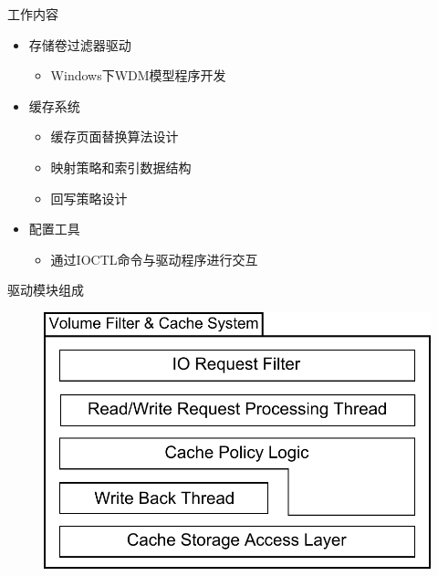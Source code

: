 \documentclass[compress]{beamer}
\begin{document}
\begin{frame}{工作内容}
\begin{itemize}
\item 存储卷过滤器驱动
    \begin{itemize}
    \item Windows下WDM模型程序开发
    \end{itemize}
\item 缓存系统
    \begin{itemize}
    \item 缓存页面替换算法设计
    \item 映射策略和索引数据结构
    \item 回写策略设计
    \end{itemize}
\item 配置工具
    \begin{itemize}
    \item 通过IOCTL命令与驱动程序进行交互
    \end{itemize}
\end{itemize}
\end{frame}

\begin{frame}{驱动模块组成}
\begin{figure}
\includegraphics[width=0.8\linewidth]{../graph/sys-flt-arch}
\end{figure}
\end{frame}
\end{document}
